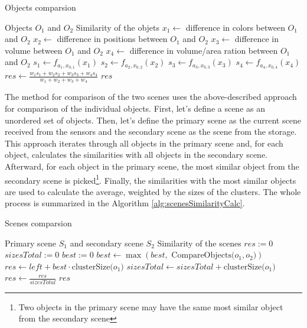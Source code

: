 \begin{algorithm}
    \caption{Objects comparsion}\label{alg:objectSimilarityCalc}
    \begin{algorithmic}
        \Require Objects $O_1$ and $O_2$
        \Ensure Similarity of the objets
        \State $x_1 \leftarrow $ difference in colors between $O_1$ and $O_2$
        \State $x_2 \leftarrow $ difference in positions between $O_1$ and $O_2$
        \State $x_3 \leftarrow $ difference in volume between $O_1$ and $O_2$
        \State $x_4 \leftarrow $ difference in volume/area ration between $O_1$ and $O_2$
        \State $s_1 \leftarrow f_{a_1,x_{0,1}}(x_1)$
        \State $s_2 \leftarrow f_{a_2,x_{0,2}}(x_2)$
        \State $s_3 \leftarrow f_{a_3,x_{0,3}}(x_3)$
        \State $s_4 \leftarrow f_{a_4,x_{0,4}}(x_4)$
        \State $res \leftarrow\frac{w_1s_1 + w_2s_2 + w_3s_3 + w_4s_4}{w_1+w_2+w_3+w_4}$
        \State\Return $res$
    \end{algorithmic}
\end{algorithm}

The method for comparison of the two scenes uses the above-described approach for comparison of the individual objects. First, let's define a scene as an unordered set of objects. Then, let's define the primary scene as the current scene received from the sensors and the secondary scene as the scene from the storage. This approach iterates through all objects in the primary scene and, for each object, calculates the similarities with all objects in the secondary scene. Afterward, for each object in the primary scene, the most similar object from the secondary scene is picked\footnote{Two objects in the primary scene may have the same most similar object from the secondary scene}. Finally, the similarities with the most similar objects are used to calculate the average, weighted by the sizes of the clusters. The whole process is summarized in the Algorithm \ref{alg:scenesSimilarityCalc}.

\begin{algorithm}
    \caption{Scenes comparsion}\label{alg:scenesSimilarityCalc}
    \begin{algorithmic}
        \Require Primary scene $S_1$ and secondary scene $S_2$
        \Ensure Similarity of the scenes
        \State $res := 0$
        \State $sizesTotal := 0$
        \State $best := 0$
        \State $best \leftarrow \max(best,\text{ CompareObjects($o_1,o_2$)})$
        \EndFor
        \State $res \leftarrow left + best \cdot \text{clusterSize($o_1$)}$
        \State $sizesTotal \leftarrow sizesTotal + \text{clusterSize($o_1$)}$
        \EndFor
        \State $res \leftarrow \frac{res}{sizesTotal}$
        \State\Return $res$
    \end{algorithmic}
\end{algorithm}

